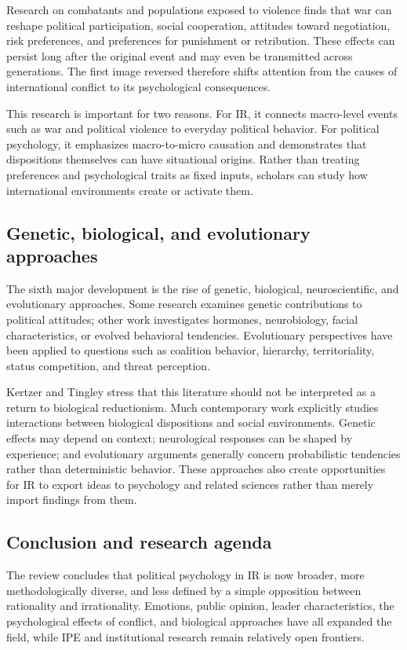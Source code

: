 Research on combatants and populations exposed to violence finds that war can reshape political participation, social cooperation, attitudes toward negotiation, risk preferences, and preferences for punishment or retribution. These effects can persist long after the original event and may even be transmitted across generations. The first image reversed therefore shifts attention from the causes of international conflict to its psychological consequences.

This research is important for two reasons. For IR, it connects macro-level events such as war and political violence to everyday political behavior. For political psychology, it emphasizes macro-to-micro causation and demonstrates that dispositions themselves can have situational origins. Rather than treating preferences and psychological traits as fixed inputs, scholars can study how international environments create or activate them.

\subsection{Genetic, biological, and evolutionary approaches}

The sixth major development is the rise of genetic, biological, neuroscientific, and evolutionary approaches. Some research examines genetic contributions to political attitudes; other work investigates hormones, neurobiology, facial characteristics, or evolved behavioral tendencies. Evolutionary perspectives have been applied to questions such as coalition behavior, hierarchy, territoriality, status competition, and threat perception.

Kertzer and Tingley stress that this literature should not be interpreted as a return to biological reductionism. Much contemporary work explicitly studies interactions between biological dispositions and social environments. Genetic effects may depend on context; neurological responses can be shaped by experience; and evolutionary arguments generally concern probabilistic tendencies rather than deterministic behavior. These approaches also create opportunities for IR to export ideas to psychology and related sciences rather than merely import findings from them.

\subsection{Conclusion and research agenda}

The review concludes that political psychology in IR is now broader, more methodologically diverse, and less defined by a simple opposition between rationality and irrationality. Emotions, public opinion, leader characteristics, the psychological effects of conflict, and biological approaches have all expanded the field, while IPE and institutional research remain relatively open frontiers.

